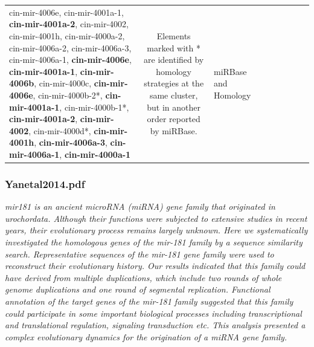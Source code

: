 \documentclass[graybox]{svmult}
\begin{document}
\begin{small}
\begin{center}
\begin{longtable}{lclllp{2.5cm}p{3cm}p{2.5cm}p{1cm}}
cin-mir-4006e, cin-mir-4001a-1, \textbf{cin-mir-4001a-2}, cin-mir-4002, 
cin-mir-4001h, 
cin-mir-4000a-2, cin-mir-4006a-2, cin-mir-4006a-3, cin-mir-4006a-1, 
\textbf{cin-mir-4006e}, \textbf{cin-mir-4001a-1}, \textbf{cin-mir-4006b}, 
cin-mir-4000c, \textbf{cin-mir-4006e}, cin-mir-4000b-2*, 
\textbf{cin-mir-4001a-1}, cin-mir-4000b-1*, \textbf{cin-mir-4001a-2}, 
\textbf{cin-mir-4002}, cin-mir-4000d*, \textbf{cin-mir-4001h}, 
\textbf{cin-mir-4006a-3}, \textbf{cin-mir-4006a-1}, \textbf{cin-mir-4000a-1} & 
Elements marked with * are identified by homology strategies at the same 
cluster, but in another order reported by miRBase. & 
miRBase and Homology & \cite{Hendrix2010} \\
\cline{1-9}
\end{longtable}
\end{center}
\end{small}

\iffalse
\subsubsection{Yanetal2014.pdf}

\cite{Yang2014}
\textit{mir181 is an ancient microRNA (miRNA) gene family that originated in urochordata. Although their functions were subjected to extensive studies in recent years, their evolutionary process remains largely unknown. Here we systematically investigated the homologous genes of the mir-181 family by a sequence similarity search. Representative sequences of the mir-181 gene family were used to reconstruct their evolutionary history. Our results indicated that this family could have derived from multiple duplications, which include two rounds of whole genome duplications and one round of segmental replication. Functional annotation of the target genes of the mir-181 family suggested that this family could participate in some important biological processes including transcriptional and translational regulation, signaling transduction etc. This analysis presented a complex evolutionary dynamics for the origination of a miRNA gene family.}
\end{document}
